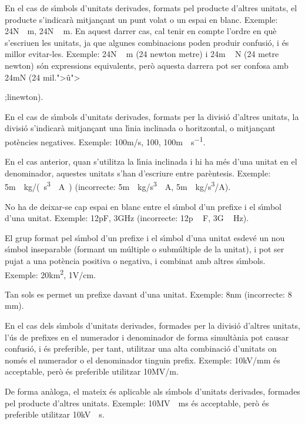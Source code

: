 En el cas de s\'{\i}mbols d'unitats derivades, formats pel producte
d'altres unitats, el producte s'indicar\`{a} mitjan\c{c}ant un punt volat o
un espai en blanc. Exemple: 24\unit{N\cdot m}, 24\unit{N\,m}. En
aquest darrer cas, cal tenir en compte  l'ordre en qu\`{e} s'escriuen
les unitats, ja que algunes combinacions poden produir confusi\'{o}, i
\'{e}s millor evitar-les. Exemple: 24\unit{N\,m} (24 newton metre) i
24\unit{m\,N} (24 metre newton) s\'{o}n expressions equivalents, per\`{o}
aquesta darrera pot ser confosa amb 24\unit{mN} (24 mil.{">}\^{u}{">}{;linewton).

En el cas de s\'{\i}mbols d'unitats derivades, formats per la divisi\'{o}
d'altres unitats, la divisi\'{o} s'indicar\`{a} mitjan\c{c}ant una l\'{\i}nia
inclinada o horitzontal, o mitjan\c{c}ant pot\`{e}ncies negatives. Exemple:
100\unit{m/s}, 100\unit{}, 100\unit{m\cdot s^{-1}}.

En el cas anterior, quan s'utilitza la l\'{\i}nia inclinada i hi ha m\'{e}s
d'una unitat en el denominador, aquestes unitats s'han d'escriure
entre par\`{e}ntesis. Exemple: 5\unit{m\cdot kg/(s^3\cdot A)}
(incorrecte: 5\unit{m\cdot kg/s^3\cdot A}, 5\unit{m\cdot kg/s^3/
A}).

No ha de deixar-se cap espai en blanc entre el s\'{\i}mbol d'un prefixe i
el s\'{\i}mbol d'una unitat. Exemple: 12\unit{pF}, 3\unit{GHz}
(incorrecte: 12\unit{p\,F}, 3\unit{G\,Hz}).

El grup format pel s\'{\i}mbol d'un prefixe i el s\'{\i}mbol d'una unitat
esdev\'{e} un nou s\'{\i}mbol inseparable (formant un m\'{u}ltiple o subm\'{u}ltiple
de la unitat), i pot ser pujat a una pot\`{e}ncia positiva o negativa, i
combinat amb altres s\'{\i}mbols. Exemple: 20\unit{km^2}, 1\unit{V/cm}.

Tan sols es permet un prefixe davant d'una unitat. Exemple:
8\unit{nm} (incorrecte: 8 m\micro m).

En el cas dels s\'{\i}mbols d'unitats derivades, formades per la divisi\'{o}
d'altres unitats, l'\'{u}s de prefixes en el numerador i denominador de
forma simult\`{a}nia pot causar confusi\'{o}, i \'{e}s preferible, per tant,
utilitzar una alta combinaci\'{o} d'unitats on nom\'{e}s el numerador o el
denominador tinguin prefix. Exemple: 10\unit{kV/mm} \'{e}s acceptable,
per\`{o} \'{e}s preferible utilitzar 10\unit{MV/m}.

De forma an\`{a}loga, el mateix \'{e}s aplicable als s\'{\i}mbols d'unitats
derivades, formades pel producte d'altres unitats.  Exemple:
10\unit{MV\cdot ms} \'{e}s acceptable, per\`{o} \'{e}s preferible utilitzar
10\unit{kV\cdot s}.

}
